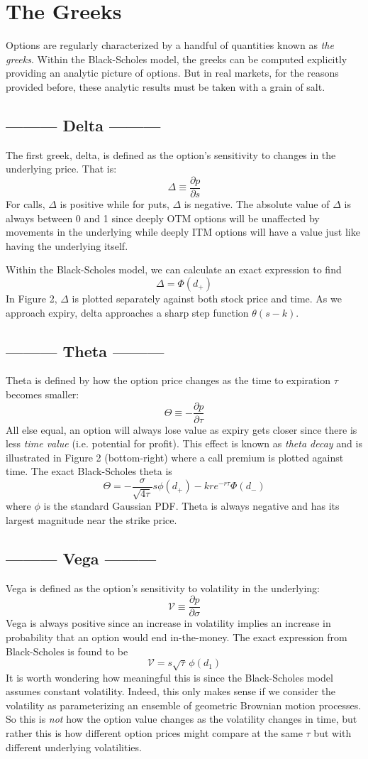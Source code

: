 \documentclass[10pt,a4paper,twocolumn]{article}
\newcommand\strategy[1]{{\centering\vspace{0.1in}\subsection*{ --------- #1 ---------}}}
\begin{document}
	\section*{The Greeks}
	
	Options are regularly characterized by a handful of quantities known as \emph{the greeks}. Within the Black-Scholes model, the greeks can be computed explicitly providing an analytic picture of options. But in real markets, for the reasons provided before, these analytic results must be taken with a grain of salt.
	
	\strategy{Delta}
	The first greek, delta, is defined as the option's sensitivity to changes in the underlying price. That is:
	$$ \Delta \equiv \frac{\partial p}{\partial s} $$
	For calls, $\Delta$ is positive while for puts, $\Delta$ is negative. The absolute value of $\Delta$ is always between 0 and 1 since deeply OTM options will be unaffected by movements in the underlying while deeply ITM options will have a value just like having the underlying itself. 
	
	Within the Black-Scholes model, we can calculate an exact expression to find 
	$$\Delta = \Phi(d_+) $$	
	In Figure 2, $\Delta$ is plotted separately against both stock price and time. As we approach expiry, delta approaches a sharp step function $\theta(s-k)$.
	
	\strategy{Theta}
	Theta is defined by how the option price changes as the time to expiration $\tau$ becomes smaller:
	$$ \Theta \equiv - \frac{\partial p}{\partial \tau} $$
	All else equal, an option will always lose value as expiry gets closer since there is less \emph{time value} (i.e. potential for profit). This effect is known as \emph{theta decay} and is illustrated in Figure 2 (bottom-right) where a call premium is plotted against time. The exact Black-Scholes theta is
	$$ \Theta = -\frac{\sigma}{\sqrt{4\tau}} s\phi(d_+) - kre^{-r\tau}\Phi(d_-) $$
	where $\phi$ is the standard Gaussian PDF. Theta is always negative and has its largest magnitude near the strike price.

	\strategy{Vega}
	Vega is defined as the option's sensitivity to volatility in the underlying:
	$$ \mathcal{V}\equiv \frac{\partial p}{\partial \sigma} $$
	Vega is always positive since an increase in volatility implies an increase in probability that an option would end in-the-money. The exact expression from Black-Scholes is found to be
	$$ \mathcal{V} = s\sqrt{\tau}\,\phi(d_1) $$
	It is worth wondering how meaningful this is since the Black-Scholes model assumes constant volatility. Indeed, this only makes sense if we consider the volatility as parameterizing an ensemble of geometric Brownian motion processes. So this is \emph{not} how the option value changes as the volatility changes in time, but rather this is how different option prices might compare at the same $\tau$ but with different underlying volatilities. 
	
\end{document}
